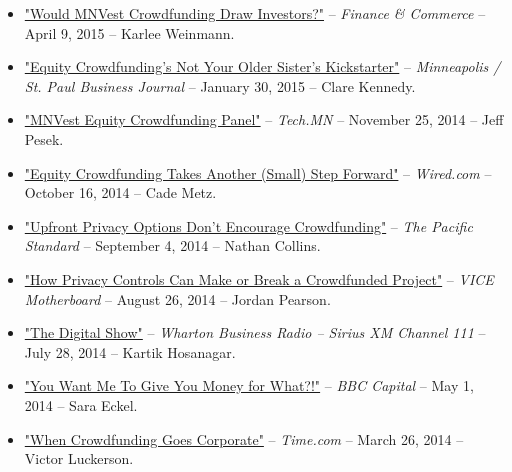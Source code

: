 \documentclass[10.5pt,letterpaper,sans]{moderncv}        %
\begin{document}
\begin{itemize}
\item \textcolor{gray}{\href{http://finance-commerce.com/2015/04/would-mnvest-crowdfunding-draw-investors/}{"Would MNVest Crowdfunding Draw Investors?"}} -- \textit{Finance \& Commerce} -- April 9, 2015 -- Karlee Weinmann.

\item \textcolor{gray}{\href{http://www.bizjournals.com/twincities/print-edition/2015/01/30/equity-crowdfunding-gordon-burtch.html}{"Equity Crowdfunding's Not Your Older Sister's Kickstarter"}} -- \textit{Minneapolis / St. Paul Business Journal} -- January 30, 2015 -- Clare Kennedy.

\item \textcolor{gray}{\href{http://tech.mn/news/2014/11/25/video-mnvest-equity-crowdfunding-panel/}{"MNVest Equity Crowdfunding Panel"}} -- \textit{Tech.MN} -- November 25, 2014 -- Jeff Pesek.

\item \textcolor{gray}{\href{http://www.wired.com/2014/10/equity-crowdfunding-takes-another-small-step-forward/}{"Equity Crowdfunding Takes Another (Small) Step Forward"}} -- \textit{Wired.com} -- October 16, 2014 -- Cade Metz.

\item \textcolor{gray}{\href{http://www.psmag.com/navigation/nature-and-technology/privacy-doesnt-encourage-crowdfunding-90061/}{"Upfront Privacy Options Don't Encourage Crowdfunding"}} -- \textit{The Pacific Standard} -- September 4, 2014 -- Nathan Collins.

\item \textcolor{gray}{\href{http://motherboard.vice.com/en_ca/read/how-privacy-controls-can-make-or-break-a-crowdfunded- project}{"How Privacy Controls Can Make or Break a Crowdfunded Project"}} -- \textit{VICE Motherboard} -- August 26, 2014 -- Jordan Pearson.

\item \textcolor{gray}{\href{http://www.siriusxm.com/businessradio}{"The Digital Show"}} -- \textit{Wharton Business Radio -- Sirius XM Channel 111} -- July 28, 2014 -- Kartik Hosanagar.

\item \textcolor{gray}{\href{http://www.bbc.com/capital/story/20140501-you-want-money-for-what}{"You Want Me To Give You Money for What?!"}} -- \textit{BBC Capital} -- May 1, 2014 -- Sara Eckel.

\item \textcolor{gray}{\href{http://time.com/39271/oculus-facebook-kickstarter-backlash/}{"When Crowdfunding Goes Corporate"}} -- \textit{Time.com} -- March 26, 2014 -- Victor Luckerson.


\end{itemize}
\end{document}
